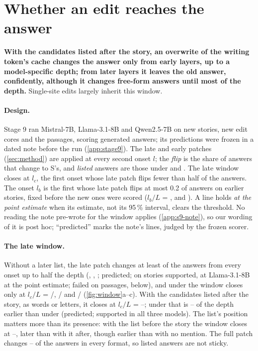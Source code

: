 \section{Whether an edit reaches the answer}\label{sec:claim3}

\textbf{With the candidates listed after the story, an overwrite of the writing token's cache changes the answer only from early layers, up to a model-specific depth; from later layers it leaves the old answer, confidently, although it changes free-form answers until most of the depth.} Single-site edits largely inherit this window.

\paragraph{Design.}
Stage 9 ran Mistral-7B, Llama-3.1-8B and Qwen2.5-7B on \NqStories{} new stories, \NqCores{} new edit cores and the \NqPassages{} passages, scoring generated answers; its predictions were frozen in a dated note before the run (\cref{app:stage9}). The late and early patches (\cref{sec:method}) are applied at every second onset $l$; the \emph{flip} is the share of answers that change to S's, and \emph{listed} answers are those under \fmtListA{} and \fmtLetter. The late window closes at $l_c$, the first onset whose late patch flips fewer than half of the answers. The onset $l_b$ is the first whose late patch flips at most 0.2 of \fmtListA{} answers on \NqCalib{} earlier stories, fixed before the new ones were scored ($l_b/L$ = \NqLbFracMistralSeven, \NqLbFracLlamaEight{} and \NqLbFracQwenSeven). A line holds \emph{at the point estimate} when its estimate, not its 95\,\% interval, clears the threshold. No reading the note pre-wrote for the window applies (\cref{app:s9-note}), so our wording of it is post hoc; ``predicted'' marks the note's lines, judged by the frozen scorer.

\paragraph{The late window.}
Without a later list, the late patch changes at least \NqPoneMinMin{} of the answers from every onset up to half the depth (\fmtNone, \fmtBefore, \fmtNull; predicted; on stories supported, at Llama-3.1-8B at the point estimate; failed on passages, below), and under \fmtNone{} the window closes only at $l_c/L$ = \NqLcNoneMistralSeven/\NqLayersMistralSeven, \NqLcNoneLlamaEight/\NqLayersLlamaEight{} and \NqLcNoneQwenSeven/\NqLayersQwenSeven{} (\cref{fig:window}a--c). With the candidates listed after the story, as words or letters, it closes at $l_c/L$ = \NqLcFracListedMin--\NqLcFracListedMax; under \fmtListA{} that is \NqGapNoneAfterMin--\NqGapNoneAfterMax{} of the depth earlier than under \fmtNone{} (predicted; supported in all three models). The list's position matters more than its presence: with the list before the story the window closes at \NqLcFracBeforeMin--\NqLcFracBeforeMax, later than with it after, though earlier than with no mention. The full patch changes \NqFullMin--\NqFullMax{} of the answers in every format, so listed answers are not sticky.

